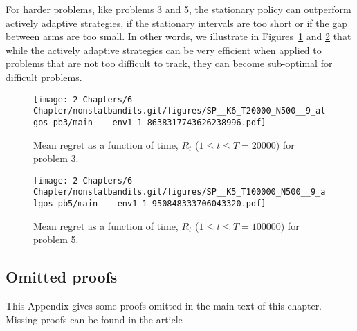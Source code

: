 For harder problems, like problems 3 and 5, the stationary policy \klUCB{} can outperform actively adaptive strategies, if the stationary intervals are too short or if the gap between arms are too small.
In other words, we illustrate in Figures~\ref{fig:6:meanRegretPb3} and \ref{fig:6:meanRegretPb5} that while the actively adaptive strategies can be very efficient when applied to problems that are not too difficult to track, they can become sub-optimal for difficult problems.

\begin{figure}[h!]  %
    \centering
    \texttt{[image: 2-Chapters/6-Chapter/nonstatbandits.git/figures/SP\_\_K6\_T20000\_N500\_\_9\_algos\_pb3/main\_\_\_\_env1-1\_8638317743626238996.pdf]}
    \caption{Mean regret as a function of time, $R_t$ ($1 \leq t \leq T = 20000$) for problem 3.}
    \label{fig:6:meanRegretPb3}
\end{figure}


\begin{figure}[h!]  %
    \centering
    \texttt{[image: 2-Chapters/6-Chapter/nonstatbandits.git/figures/SP\_\_K5\_T100000\_N500\_\_9\_algos\_pb5/main\_\_\_\_env1-1\_950848333706043320.pdf]}
    \caption{Mean regret as a function of time, $R_t$ ($1 \leq t \leq T = 100000$) for problem 5.}
    \label{fig:6:meanRegretPb5}
\end{figure}


\subsection{Omitted proofs}\label{proof:6:Conc}

This Appendix gives some proofs omitted in the main text of this chapter.
Missing proofs can be found in the article \cite{Besson2019GLRT}.




